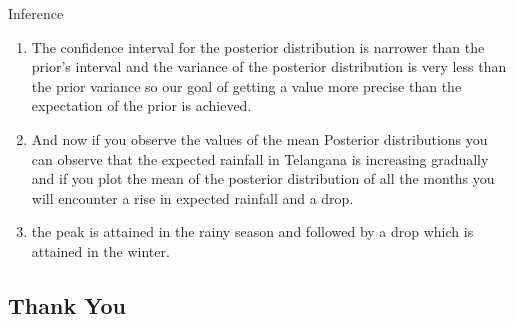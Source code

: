 \documentclass{beamer}
\begin{document}
\begin{frame}{Inference}
\begin{enumerate}
    \item The confidence interval for the posterior distribution is narrower than the prior's interval and the variance of the posterior distribution is very less than the prior variance so our goal of getting a value more precise than the expectation of the prior is achieved. 
    \item And now if you observe the values of the mean Posterior distributions you can observe that the expected rainfall in Telangana is increasing gradually and if you plot the mean of the posterior distribution of all the months you will encounter a rise in expected rainfall and a drop.
    \item the peak is attained in the rainy season and followed by a  drop which is attained in the winter.
\end{enumerate}

\end{frame}

\begin{frame}
\section{Thank You}  
\end{frame}
\end{document}
